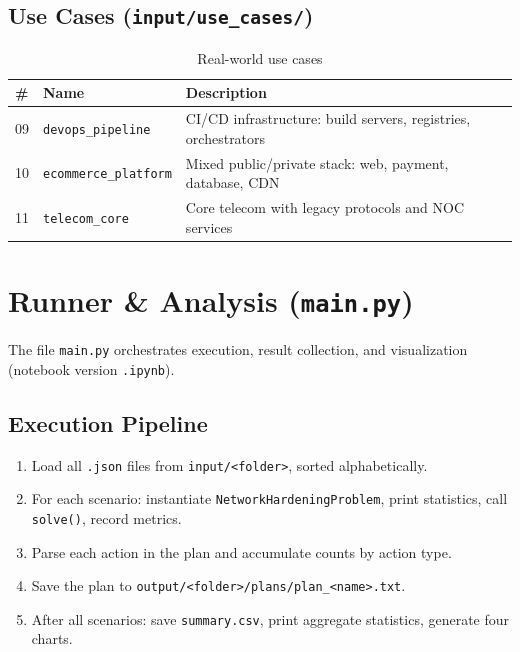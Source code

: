 \documentclass[12pt,a4paper]{article}
\newcommand{\hrow}{\rowcolor{rowgray}}
\begin{document}
	\subsection{Use Cases (\texttt{input/use\_cases/})}
	
	\begin{table}[h!]
		\centering
		\caption{Real-world use cases}
		\renewcommand{\arraystretch}{1.3}
		\begin{tabularx}{\linewidth}{@{} C{0.7cm} L{4.8cm} X @{}}
			\toprule
			\textbf{\#} & \textbf{Name} & \textbf{Description} \\
			\midrule
			\hrow 09 & \texttt{devops\_pipeline}    & CI/CD infrastructure: build servers, registries, orchestrators \\
			10 & \texttt{ecommerce\_platform} & Mixed public/private stack: web, payment, database, CDN \\
			\hrow 11 & \texttt{telecom\_core}       & Core telecom with legacy protocols and NOC services \\
			\bottomrule
		\end{tabularx}
	\end{table}
	\newpage
	\section{Runner \& Analysis (\texttt{main.py})}
	
	The file \texttt{main.py} orchestrates execution, result collection, and visualization (notebook
	version \texttt{.ipynb}).
	
	\subsection{Execution Pipeline}
	
	\begin{enumerate}[leftmargin=1.5em]
		\item Load all \texttt{.json} files from \texttt{input/<folder>}, sorted alphabetically.
		\item For each scenario: instantiate \texttt{NetworkHardeningProblem}, print statistics, call \texttt{solve()}, record metrics.
		\item Parse each action in the plan and accumulate counts by action type.
		\item Save the plan to \texttt{output/<folder>/plans/plan\_<name>.txt}.
		\item After all scenarios: save \texttt{summary.csv}, print aggregate statistics, generate four charts.
	\end{enumerate}
	
\end{document}
